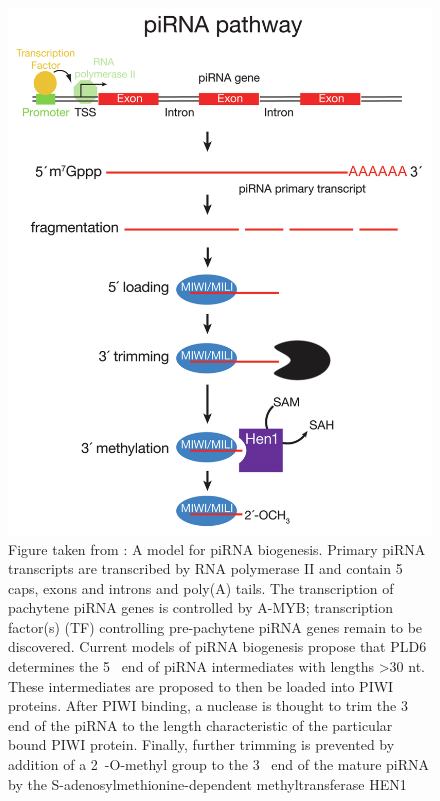 \begin{figure}[htbp]
	\centering 
	\includegraphics{Figures/Chapter1/mammalian_piRNA_pathway.png}
	\caption[A model for Mammalian piRNA biogenesis]
	{
		Figure taken from \citep{Li2013e}: A model for piRNA biogenesis. Primary piRNA transcripts are transcribed by RNA polymerase II and contain 5\textprime~ caps, exons and introns and poly(A) tails. The transcription of pachytene piRNA genes is controlled by A-MYB; transcription factor(s) (TF) controlling pre-pachytene piRNA genes remain to be discovered. Current models of piRNA biogenesis propose that PLD6 determines the 5\textprime~ end of piRNA intermediates with lengths >30 nt. These intermediates are proposed to then be loaded into PIWI proteins. After PIWI binding, a nuclease is thought to trim the 3\textprime~ end of the piRNA to the length characteristic of the particular bound PIWI protein. Finally, further trimming is prevented by addition of a 2\textprime~-O-methyl group to the 3\textprime~ end of the mature piRNA by the S-adenosylmethionine-dependent methyltransferase HEN1
	}
	\label{fig:Mammalian piRNA BioGensis; MolCel2013 Review}
\end{figure}

